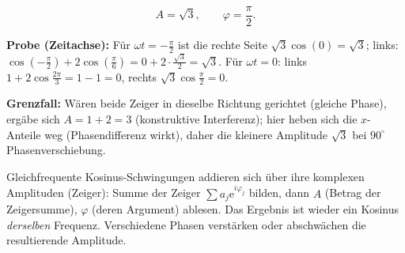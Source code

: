\begin{ergebnis}
\begin{equation*}
  A=\sqrt3,\qquad \varphi=\frac\pi2 .
\end{equation*}
\end{ergebnis}

\begin{kontrolle}
\textbf{Probe (Zeitachse):} Für $\omega t=-\frac\pi2$ ist die rechte Seite
$\sqrt3\cos(0)=\sqrt3$; links:
$\cos(-\frac\pi2)+2\cos(\frac\pi6)=0+2\cdot\frac{\sqrt3}{2}=\sqrt3$.
\checkmark Für $\omega t=0$: links $1+2\cos\frac{2\pi}{3}=1-1=0$, rechts
$\sqrt3\cos\frac\pi2=0$. \checkmark

\textbf{Grenzfall:} Wären beide Zeiger in dieselbe Richtung gerichtet
(gleiche Phase), ergäbe sich $A=1+2=3$ (konstruktive Interferenz); hier
heben sich die $x$-Anteile weg (Phasendifferenz wirkt), daher die kleinere
Amplitude $\sqrt3$ bei $90^\circ$ Phasenverschiebung. \checkmark
\end{kontrolle}

\begin{merksatz}
Gleichfrequente Kosinus-Schwingungen addieren sich über ihre komplexen
Amplituden (Zeiger): Summe der Zeiger $\sum a_j\mathrm e^{i\varphi_j}$
bilden, dann $A$ (Betrag der Zeigersumme), $\varphi$ (deren Argument) ablesen. Das Ergebnis ist
wieder ein Kosinus \emph{derselben} Frequenz. Verschiedene Phasen
verstärken oder abschwächen die resultierende Amplitude.
\end{merksatz}
